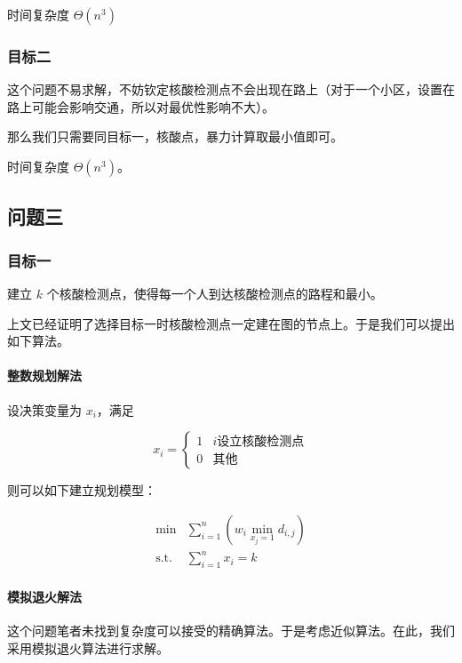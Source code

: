 \documentclass{cumcmthesis}
\begin{document}
时间复杂度 $\Theta(n^3)$

\subsubsection{目标二}

这个问题不易求解，不妨钦定核酸检测点不会出现在路上（对于一个小区，设置在路上可能会影响交通，所以对最优性影响不大）。

那么我们只需要同目标一，核酸点，暴力计算取最小值即可。

时间复杂度 $\Theta(n^3)$。

\subsection{问题三}

\subsubsection{目标一}

建立 $k$ 个核酸检测点，使得每一个人到达核酸检测点的路程和最小。

上文已经证明了选择目标一时核酸检测点一定建在图的节点上。于是我们可以提出如下算法。


\paragraph{整数规划解法}

设决策变量为 $x_i$，满足

\begin{equation*}
    x_i=\begin{cases}
    1 & i \text{设立核酸检测点}\\
    0 & \text{其他}
    \end{cases}
\end{equation*}

则可以如下建立规划模型：

\begin{align*}
    \min &\sum_{i=1}^n \left(w_i \min_{x_j=1} d_{i,j}\right)\\
    \operatorname{s.t.} &\sum_{i=1}^n x_i=k
\end{align*}

\paragraph{模拟退火解法}

这个问题笔者未找到复杂度可以接受的精确算法。于是考虑近似算法。在此，我们采用模拟退火算法进行求解。
\end{document}
